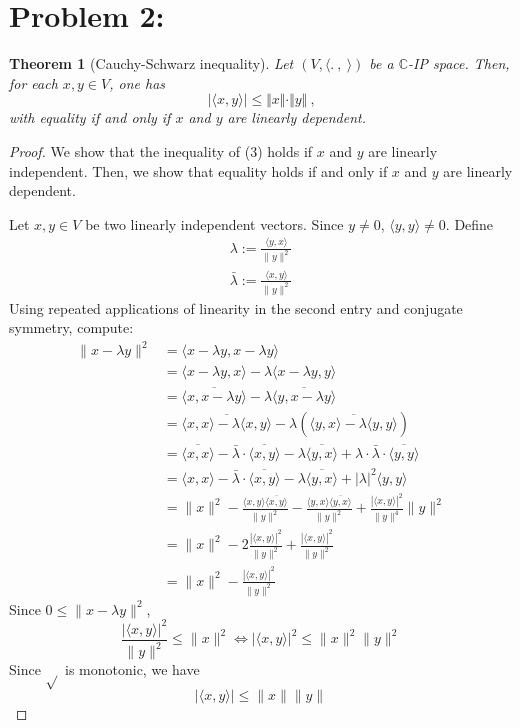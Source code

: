 \documentclass[12pt, reqno]{amsart}
\newtheorem{theorem}{Theorem}[section]
\theoremstyle{definition}
\theoremstyle{remark}
\begin{document}
\section*{Problem 2:}

\begin{theorem}[Cauchy-Schwarz inequality]\label{thm_CS}
Let $(V, \langle . ~,~ \rangle)$ be a $\mathbb{C}$-IP space. Then, for each $x, y \in V$, one has
\begin{equation}
\vert \langle x , y \rangle \vert \leq \Vert x \Vert \cdot \Vert y \Vert ~\mbox{,}
\end{equation}
with equality if and only if $x$ and $y$ are linearly dependent.

\end{theorem}


\begin{proof}

We show that the inequality of (3) holds if $x$ and $y$ are linearly independent. Then, we show that equality holds if and only if $x$ and $y$ are linearly dependent.
    
Let $x,y\in V$ be two linearly independent vectors. Since $y\ne0$, $\langle y,y\rangle \ne0$. Define \begin{align*}\lambda:= \frac{\langle y,x\rangle}{\|y\|^{2}}\\
    \bar \lambda:=\frac{\langle x,y\rangle}{\|y\|^{2}} \end{align*}Using repeated applications of linearity in the second entry and conjugate symmetry, compute:
    \begin{align*}
    \|x-\lambda y\|^{2}&= \langle x-\lambda y,x-\lambda y\rangle\\
    &= \langle x-\lambda y, x\rangle - \lambda\langle x-\lambda y, y\rangle\\
    &= \overline{\langle x, x-\lambda y\rangle}-\lambda\overline{\langle y,x-\lambda y\rangle}\\
    &= \overline{\langle x,x\rangle-\lambda\langle x,y\rangle}-\lambda(\overline{\langle y,x\rangle-\lambda\langle y,y\rangle})\\
    &= \overline{\langle x,x\rangle}-\bar \lambda\cdot\overline{\langle x, y\rangle}-\lambda\overline{\langle y,x\rangle}+\lambda\cdot\bar \lambda\cdot\overline{\langle y,y\rangle}\\
    &= \langle x,x\rangle-\bar \lambda\cdot\overline{\langle x, y\rangle}-\lambda\overline{\langle y,x\rangle}+|\lambda|^{2}\langle y,y\rangle\\
    &= \|x\|^{2}- \frac{\langle x,y\rangle\overline{\langle x,y\rangle}}{\|y\|^{2}}- \frac{\langle y,x\rangle\overline{\langle y,x\rangle}}{\|y\|^{2}}+ \frac{|\langle x,y\rangle|^{2}}{\|y\|^{4}}\|y\|^{2}\\
    &= \|x\|^{2}- 2\frac{|\langle x,y\rangle|^{2}}{\|y\|^{2}} + \frac{|\langle x,y\rangle|^{2}}{\|y\|^{2}}\\
    &= \|x\|^{2}- \frac{|\langle x,y\rangle|^{2}}{\|y\|^{2}}
   \end{align*}
    Since $0\le\|x-\lambda y\|^{2}$, $$\frac{|\langle x,y\rangle|^{2}}{\|y\|^{2}}\le \|x\|^{2}\iff|\langle x,y\rangle|^{2}\le\|x\|^{2}\|y\|^{2}$$Since $\sqrt{}$ is monotonic, we have $$|\langle x,y\rangle|\le \|x\|\|y\|$$
    

\end{proof}
\end{document}
